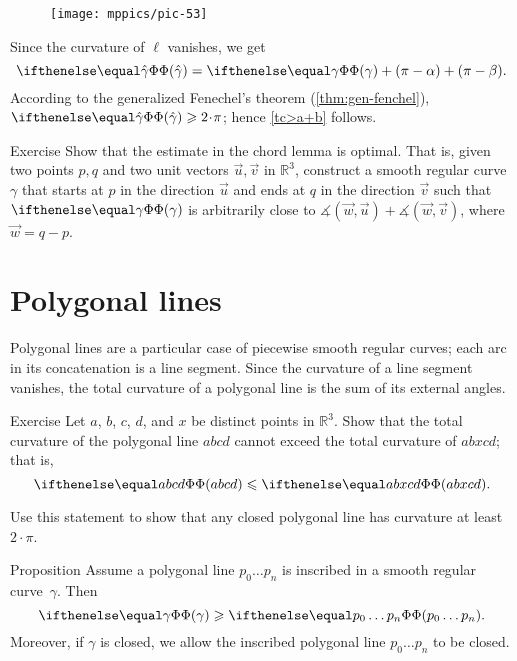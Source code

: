 \begin{wrapfigure}{r}{45 mm}
\vskip-5mm
\centering
\texttt{[image: mppics/pic-53]}
\vskip0mm
\end{wrapfigure}

Since the curvature of $\ell$ vanishes, we get 
\[\tc{\hat\gamma}=\tc\gamma+(\pi-\alpha)+(\pi-\beta).\]
According to the generalized Fenechel's theorem (\ref{thm:gen-fenchel}),
$\tc{\hat\gamma}\ge 2\cdot\pi$;
hence \ref{tc>a+b} follows.
\qeds

\begin{thm}{Exercise}\label{ex:chord-lemma-optimal}
Show that the estimate in the chord lemma is optimal.
That is, given two points $p, q$ and two unit vectors $\vec u,\vec v$ in $\mathbb{R}^3$,
construct a smooth regular curve $\gamma$ that starts at $p$ in the direction $\vec u$ and ends at $q$ in the direction $\vec v$ such that 
$\tc\gamma$ is arbitrarily close to $\measuredangle(\vec w,\vec u)+\measuredangle(\vec w,\vec v)$, where $\vec w=q-p$.

\end{thm}

\section{Polygonal lines} 

Polygonal lines are a particular case of piecewise smooth regular curves;
each arc in its concatenation is a line segment.
Since the curvature of a line segment vanishes, the total curvature of a polygonal line is the sum of its external angles.

\begin{thm}{Exercise}\label{ex:monotonic-tc}
Let $a$, $b$, $c$, $d$, and $x$ be distinct points in $\mathbb{R}^3$.
Show that the total curvature of the polygonal line $abcd$ cannot exceed the total curvature of $abxcd$; that is, 
\[\tc {abcd} \le \tc {abxcd}.\]

Use this statement to show that any closed polygonal line has curvature at least $2\cdot\pi$.
\end{thm}



\begin{thm}{Proposition}\label{prop:inscribed-total-curvature}
Assume a polygonal line $p_0\dots p_n$ is inscribed in a smooth regular curve~$\gamma$.
Then 
\[\tc\gamma\ge \tc{p_0\dots p_n}.\]
Moreover, if $\gamma$ is closed, we allow the inscribed polygonal line $p_0\dots p_n$ to be closed.

\end{thm}

